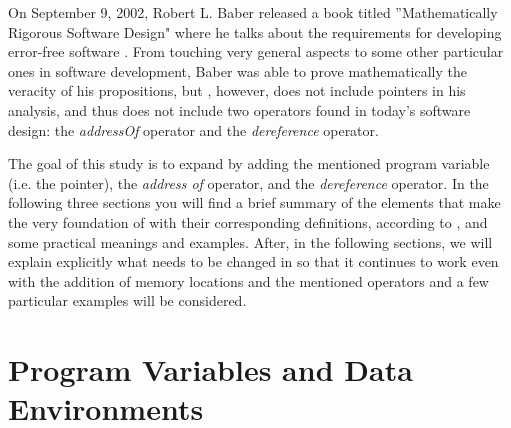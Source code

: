 \documentclass[11pt]{article}
\newcounter{definition}
\newcounter{lemma}
\newcounter{theorem}
\newcounter{example}
\begin{document}

On September 9, 2002, Robert L. Baber released a book titled ''Mathematically Rigorous Software Design" where he talks about the requirements for developing error-free software \cite{baber}. From touching very general aspects to some other particular ones in software development, Baber was able to prove mathematically the veracity of his propositions, but \cite{baber}, however, does not include pointers in his analysis, and thus does not include two operators found in today's software design: the \emph{addressOf} operator and the \emph{dereference} operator.

The goal of this study is to expand \cite{baber} by adding the mentioned program variable (i.e. the pointer), the \emph{address of} operator, and the \emph{dereference} operator. In the following three sections you will find a brief summary of the elements that make the very foundation of \cite{baber} with their corresponding definitions, according to \cite{baber}, and some practical meanings and examples. After, in the following sections, we will explain explicitly what needs to be changed in \cite{baber} so that it continues to work even with the addition of memory locations and the mentioned operators and a few particular examples will be considered.





\section{Program Variables and Data Environments}
\setcounter{definition}{0}
\setcounter{lemma}{0}
\setcounter{theorem}{0}
\setcounter{example}{0}
\end{document}
